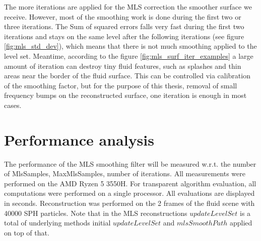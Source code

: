 The more iterations are applied for the MLS correction the smoother surface we receive. However, most of the smoothing work is done during the first two or three iterations. The Sum of squared errors falls very fast during the first two iterations and stays on the same level after the following iterations (see figure \ref{fig:mls_std_dev}), which means that there is not much smoothing applied to the level set. Meantime, according to the figure \ref{fig:mls_surf_iter_examples} a large amount of iteration can destroy tiny fluid features, such as splashes and thin areas near the border of the fluid surface. This can be controlled via calibration of the smoothing factor, but for the purpose of this thesis, removal of small frequency bumps on the reconstructed surface, one iteration is enough in most cases.

\section{Performance analysis}
The performance of the MLS smoothing filter will be measured w.r.t. the number of MlsSamples, MaxMlsSamples, number of iterations. All measurements were performed on the AMD Ryzen 5 3550H. For transparent algorithm evaluation, all computations were performed on a single processor. All evaluations are displayed in seconds. Reconstruction was performed on the 2 frames of the fluid scene with 40000 SPH particles. Note that in the MLS reconstructions $updateLevelSet$ is a total of underlying methods initial $updateLevelSet$ and $mlsSmoothPath$ applied on top of that.

